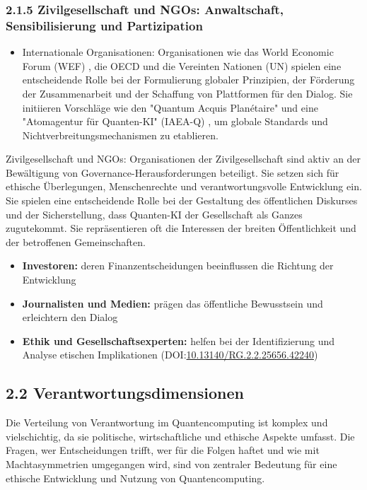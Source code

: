\subsubsection{2.1.5 Zivilgesellschaft und NGOs: Anwaltschaft, Sensibilisierung und Partizipation}
\begin{itemize}
    \item Internationale Organisationen: Organisationen wie das World Economic Forum (WEF) , die OECD  und die Vereinten Nationen (UN)  spielen eine entscheidende Rolle bei der Formulierung globaler Prinzipien, der Förderung der Zusammenarbeit und der Schaffung von Plattformen für den Dialog. Sie initiieren Vorschläge wie den "Quantum Acquis Planétaire"  und eine "Atomagentur für Quanten-KI" (IAEA-Q) , um globale Standards und Nichtverbreitungsmechanismen zu etablieren.
\end{itemize}
Zivilgesellschaft und NGOs: Organisationen der Zivilgesellschaft sind aktiv an der Bewältigung von Governance-Herausforderungen beteiligt. Sie setzen sich für ethische Überlegungen, Menschenrechte und verantwortungsvolle Entwicklung ein. Sie spielen eine entscheidende Rolle bei der Gestaltung des öffentlichen Diskurses und der Sicherstellung, dass Quanten-KI der Gesellschaft als Ganzes zugutekommt. Sie repräsentieren oft die Interessen der breiten Öffentlichkeit und der betroffenen Gemeinschaften.

    \begin{itemize}
        \item \textbf{Investoren:} deren Finanzentscheidungen beeinflussen die Richtung der Entwicklung
        \item \textbf{Journalisten und Medien:} prägen das öffentliche Bewusstsein und erleichtern den Dialog
        \item \textbf{Ethik und Gesellschaftsexperten: }helfen bei der Identifizierung und Analyse etischen Implikationen
\cite{Communities of Quantum Technologies: Stakeholder Identification, Legitimation, and Interaction}
(DOI:\href{http://dx.doi.org/10.13140/RG.2.2.25656.42240}{10.13140/RG.2.2.25656.42240})    \end{itemize}



\subsection{2.2 Verantwortungsdimensionen}
Die Verteilung von Verantwortung im Quantencomputing ist komplex und vielschichtig, da sie politische, wirtschaftliche und ethische Aspekte umfasst. Die Fragen, wer Entscheidungen trifft, wer für die Folgen haftet und wie mit Machtasymmetrien umgegangen wird, sind von zentraler Bedeutung für eine ethische Entwicklung und Nutzung von Quantencomputing.

